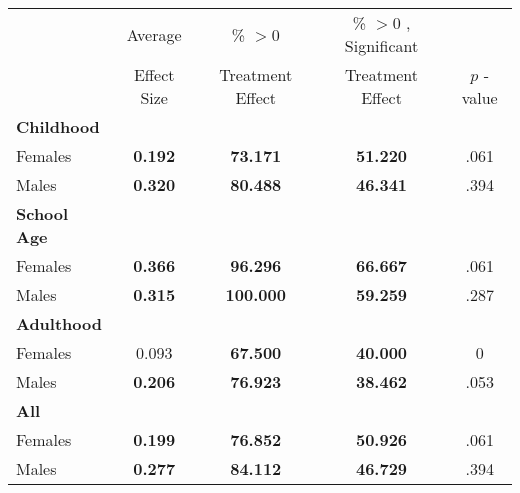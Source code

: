 \begin{tabular}{l c c c c}
\toprule
 & Average & \% $ >0 $ & \% $ >0 $ , Significant & \citet{Rosenbaum_2005_Distribution_JRSS} \\
 & Effect Size & Treatment Effect & Treatment Effect & $ p $ -value \\
\midrule
\textbf{Childhood} & & & & \\
\quad Females &  \textbf{    0.192} & \textbf{   73.171} & \textbf{   51.220} & .061 \\
\quad Males &  \textbf{    0.320} & \textbf{   80.488} & \textbf{   46.341} & .394 \\
\midrule
\textbf{School Age} & & & & \\
\quad Females &  \textbf{    0.366} & \textbf{   96.296} & \textbf{   66.667} & .061 \\
\quad Males &  \textbf{    0.315} & \textbf{  100.000} & \textbf{   59.259} & .287 \\
\midrule
\textbf{Adulthood} & & & & \\
\quad Females &      0.093 & \textbf{   67.500} & \textbf{   40.000} & 0 \\
\quad Males &  \textbf{    0.206} & \textbf{   76.923} & \textbf{   38.462} & .053 \\
\midrule
\textbf{All} & & & & \\
\quad Females &  \textbf{    0.199} & \textbf{   76.852} & \textbf{   50.926} & .061 \\
\quad Males &  \textbf{    0.277} & \textbf{   84.112} & \textbf{   46.729} & .394 \\
\bottomrule
\end{tabular}
